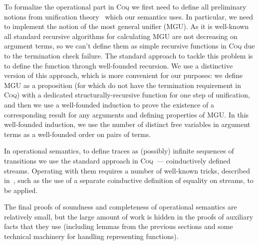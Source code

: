 To formalize the operational part in \textsc{Coq} we first need to define all preliminary notions from unification theory~\cite{Unification} which our semantics uses. In particular, we need to implement the notion of the most general unifier (MGU). As it is well-known~\cite{StructuralMGU} all standard recursive algorithms for calculating MGU are not decreasing on argument terms, so we can't define them as simple recursive functions in \textsc{Coq} due to the termination check failure. The standard approach to tackle this problem is to define the function through well-founded recursion. We use a distinctive version of this approach, which is more convenient for our purposes: we define MGU as a proposition (for which do not have the termination requirement in \textsc{Coq}) with a dedicated structurally-recursive function for one step of unification, and then we use a well-founded induction to prove the existence of a corresponding result for any arguments and defining properties of MGU. In this well-founded induction, we use the number of distinct free variables in argument terms as a well-founded order on pairs of terms.

In operational semantics, to define traces as (possibly) infinite sequences of transitions we use the standard approach in \textsc{Coq}~--- coinductively defined streams. Operating with them requires a number of well-known tricks, described in~\cite{CPDT}, such as the use of a separate coinductive definition of equality on streams, to be applied.

The final proofs of soundness and completeness of operational semantics are relatively small, but the large amount of work is hidden in the proofs of auxiliary facts that they use (including lemmas from the previous sections and some technical machinery for handling representing functions).
